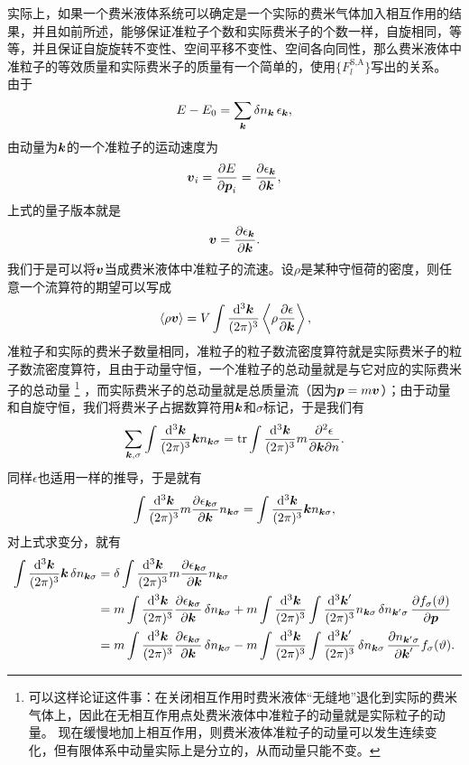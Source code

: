 实际上，如果一个费米液体系统可以确定是一个实际的费米气体加入相互作用的结果，并且如前所述，能够保证准粒子个数和实际费米子的个数一样，自旋相同，等等，并且保证自旋旋转不变性、空间平移不变性、空间各向同性，那么费米液体中准粒子的等效质量和实际费米子的质量有一个简单的，使用$\{F_l^\text{S,A}\}$写出的关系。
由于
\[
    E - E_0 = \sum_{\vb*{k}} \var{n_{\vb*{k}}} \epsilon_{\vb*{k}},
\]
由动量为$\vb*{k}$的一个准粒子的运动速度为
\[
    \vb*{v}_i = \pdv{E}{\vb*{p}_i} = \pdv{\epsilon_{\vb*{k}}}{\vb*{k}},
\]
上式的量子版本就是
\[
    {\vb*{v}} = \pdv{{\epsilon}_{\vb*{k}}}{\vb*{k}}.
\]
我们于是可以将${\vb*{v}}$当成费米液体中准粒子的流速。设$\rho$是某种守恒荷的密度，则任意一个流算符的期望可以写成
\[
    \begin{aligned}
        \expval*{\rho \vb*{v}} = V \int \frac{\dd[3]{\vb*{k}}}{(2\pi)^3} \expval{\rho \pdv{{\epsilon}}{\vb*{k}}} , 
    \end{aligned}
\]
准粒子和实际的费米子数量相同，准粒子的粒子数流密度算符就是实际费米子的粒子数流密度算符，且由于动量守恒，一个准粒子的总动量就是与它对应的实际费米子的总动量%
\footnote{
    可以这样论证这件事：在关闭相互作用时费米液体“无缝地”退化到实际的费米气体上，因此在无相互作用点处费米液体中准粒子的动量就是实际粒子的动量。
    现在缓慢地加上相互作用，则费米液体准粒子的动量可以发生连续变化，但有限体系中动量实际上是分立的，从而动量只能不变。
}%
，而实际费米子的总动量就是总质量流（因为$\vb*{p}=m\vb*{v}$）；由于动量和自旋守恒，我们将费米子占据数算符用$\vb*{k}$和$\sigma$标记，于是我们有
\[
    \sum_{\vb*{k}, \sigma} \int \frac{\dd[3]{\vb*{k}}}{(2\pi)^3} \vb*{k} {n}_{\vb*{k} \sigma} = \trace \int \frac{\dd[3]{\vb*{k}}}{(2\pi)^3} m \pdv{{\epsilon}}{\vb*{k}} {n}.
\]
同样${\epsilon}$也适用一样的推导，于是就有
\[
    \int \frac{\dd[3]{\vb*{k}}}{(2\pi)^3} m \pdv{\epsilon_{\vb*{k} \sigma}}{\vb*{k}} n_{\vb*{k} \sigma} = \int \frac{\dd[3]{\vb*{k}}}{(2\pi)^3} \vb*{k} n_{\vb*{k} \sigma},
\]
对上式求变分，就有
\[
    \begin{aligned}
        \int \frac{\dd[3]{\vb*{k}}}{(2\pi)^3} \vb*{k} \var{n_{\vb*{k} \sigma}} &= \var \int \frac{\dd[3]{\vb*{k}}}{(2\pi)^3} m \pdv{\epsilon_{\vb*{k} \sigma}}{\vb*{k}} n_{\vb*{k} \sigma} \\
        &= m \int \frac{\dd[3]{\vb*{k}}}{(2\pi)^3} \pdv{\epsilon_{\vb*{k} \sigma}}{\vb*{k}} \var{n_{\vb*{k} \sigma}} + m \int \frac{\dd[3]{\vb*{k}}}{(2\pi)^3} \int \frac{\dd[3]{\vb*{k}'}}{(2\pi)^3} n_{\vb*{k} \sigma} \var{n_{\vb*{k}' \sigma}} \pdv{f_{\sigma}(\vartheta)}{\vb*{p}} \\
        &= m \int \frac{\dd[3]{\vb*{k}}}{(2\pi)^3} \pdv{\epsilon_{\vb*{k} \sigma}}{\vb*{k}} \var{n_{\vb*{k} \sigma}} - m \int \frac{\dd[3]{\vb*{k}}}{(2\pi)^3} \int \frac{\dd[3]{\vb*{k}'}}{(2\pi)^3} \var{n_{\vb*{k} \sigma}} \pdv{n_{\vb*{k}' \sigma}}{\vb*{k}'} f_{\sigma}(\vartheta) .
    \end{aligned}
\]
